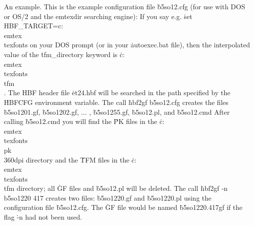 An example.
This is the example configuration file \.{b5so12.cfg} (for use with DOS or
OS/2 and the emtexdir searching engine):
\bigskip
{}
\bigskip
If you say e.g.
\medskip
\quad \.{set HBF\_TARGET=c:\\emtex\\texfonts}
\medskip
on your DOS prompt (or in your \.{autoexec.bat} file), then the interpolated
value of the \.{tfm\_directory} keyword is \.{c:\\emtex\\texfonts\\tfm\\}.
The HBF header file \.{et24.hbf} will be searched in the path specified by
the \.{HBFCFG} environment variable.
\bigskip
The call
\medskip
\quad \.{hbf2gf b5so12.cfg}
\medskip
creates the files
\medskip
\quad \.{b5so1201.gf}, \.{b5so1202.gf}, $\ldots$ , \.{b5so1255.gf},
\.{b5so12.pl}, and \.{b5so12.cmd}
\bigskip
After calling
\medskip
\quad \.{b5so12.cmd}
\medskip
you will find the \.{PK} files in the
\.{c:\\emtex\\texfonts\\pk\\360dpi} directory and the \.{TFM} files in
the \.{c:\\emtex\\texfonts\\tfm} directory; all \.{GF} files and
\.{b5so12.pl} will be deleted.
\bigskip
The call
\medskip
\quad \.{hbf2gf -n b5so1220 417}
\medskip
creates two files:
\medskip
\quad \.{b5so1220.gf} and \.{b5so1220.pl}
\medskip
using the configuration file \.{b5so12.cfg}. The \.{GF} file would be
named \.{b5so1220.417gf} if the flag \.{-n} had not been used.

